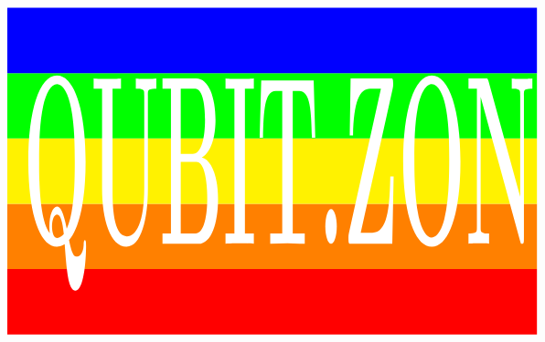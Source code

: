 \documentclass[aspectratio=169]{beamer}
\begin{document}
{
\begin{frame}
\vspace{-20pt}
\[
\hspace{-2cm}
\begin{tikzpicture}[xscale=1.2, yscale=1.8]
\foreach \x/\y in {0/red,1/orange,2/yellow,3/green,4/blue} {
  \path [fill=\y] (0,\x) rectangle +(\textwidth,1);
}
\path [use as bounding box] (current bounding box.south west) rectangle (current bounding box.north east);
\node [scale=2.5, white, yscale=3.04] at (0.5*\textwidth,2.29) {\Huge\bf a       QUBIT.ZONE};
\end{tikzpicture}
\hspace{-2cm}
\]

\end{frame}
}

\addtocounter{framenumber}{-1}



\end{document}
